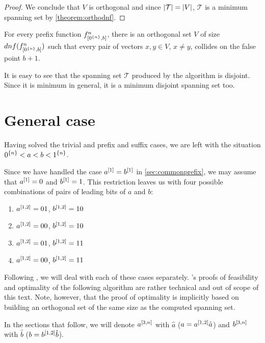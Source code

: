 \begin{proof}

We conclude that $V$ is orthogonal
and since $\lvert\mathcal{T}\rvert = \lvert V\rvert$,
$\mathcal{T}$ is a minimum spanning set
by \autoref{theorem:orthodnf}.
\end{proof}

\begin{corollary}
\label{corollary:prefixdependence}
For every prefix function $f^{n}_{[0^{\{n\}}, b]}$,
there is an orthogonal set $V$
of size $dnf(f^{n}_{[0^{\{n\}}, b]})$
such that
every pair of vectors $x,y \in V$, $x \neq y$,
collides on the false point $b+1$.
\end{corollary}

It is easy to see that the spanning set $\mathcal{T}$
produced by the algorithm is disjoint.
Since it is minimum in general,
it is a minimum disjoint spanning set too.

\section{General case}

Having solved the trivial and prefix and suffix cases,
we are left with the situation
$0^{\{n\}} < a < b < 1^{\{n\}}$.

Since we have handled the case $a^{[1]} = b^{[1]}$
in \cref{sec:commonprefix},
we may assume that $a^{[1]} = 0$ and $b^{[1]} = 1$.
This restriction leaves us with
four possible combinations of pairs
of leading bits of $a$ and $b$:

\begin{enumerate}
\item $a^{[1, 2]} = 01$, $b^{[1, 2]} = 10$
\item $a^{[1, 2]} = 00$, $b^{[1, 2]} = 10$
\item $a^{[1, 2]} = 01$, $b^{[1, 2]} = 11$
\item $a^{[1, 2]} = 00$, $b^{[1, 2]} = 11$
\end{enumerate}

Following \citet{Schieber2005154},
we will deal with each of these cases separately.
\citeauthor{Schieber2005154}'s proofs of feasibility
and optimality of the following
algorithm are rather technical and out of scope
of this text.
Note, however, that the proof of optimality is implicitly
based on building an orthogonal set of the same size
as the computed spanning set.

In the sections that follow,
we will denote $a^{[3, n]}$ with $\hat{a}$
($a = a^{[1, 2]} \hat{a}$)
and $b^{[3, n]}$ with $\hat{b}$
($b = b^{[1, 2]} \hat{b}$).

